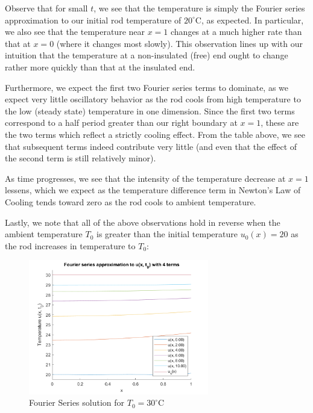 \begin{solution}
    Observe that for small $t$, we see that the temperature is simply the Fourier series approximation to our
    initial rod temperature of $20^{\circ}$C, as expected.  In particular, we also see that the temperature 
    near $x = 1$ changes at a much higher rate than that at $x = 0$ (where it changes most slowly). This 
    observation lines up with our intuition that the temperature at a non-insulated (free) end ought to change
    rather more quickly than that at the insulated end.
    
    Furthermore, we expect the first two Fourier series terms to dominate, as we expect very little oscillatory
    behavior as the rod cools from high temperature to the low (steady state) temperature in one dimension. 
    Since the first two terms correspond to a half period greater than our right boundary at $x = 1$, these are
    the two terms which reflect a strictly cooling effect. From the table above, we see that subsequent terms 
    indeed contribute very little (and even that the effect of the second term is still relatively minor).
    
    As time progresses, we see that the intensity of the temperature decrease at $x = 1$ lessens, which we expect
    as the temperature difference term in Newton's Law of Cooling tends toward zero as the rod cools to ambient 
    temperature.

    \pagebreak
    Lastly, we note that all of the above observations hold in reverse when the ambient temperature $T_0$ is 
    greater than the initial temperature $u_0(x) = 20$ as the rod increases in temperature to $T_0$:

    \begin{figure}[h]
        \centering
        \includegraphics[width=0.7\textwidth]{problem1_fourier_series_solution_4_terms_t0_30.png}
        \caption{Fourier Series solution for $T_0 = 30^{\circ}$C}
    \end{figure}


\end{solution}
